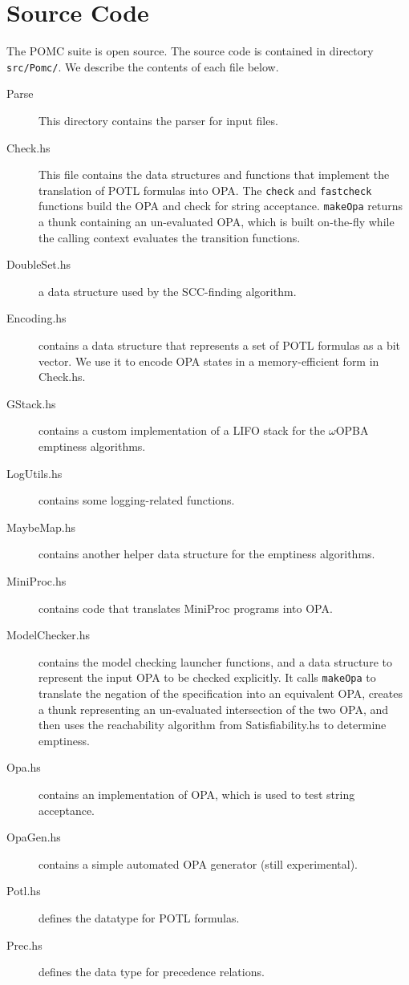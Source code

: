 \documentclass[9pt,a4paper]{article}
\begin{document}
\section{Source Code}
\label{sec:sources}
The POMC suite is open source.
The source code is contained in directory \texttt{src/Pomc/}.
We describe the contents of each file below.
\begin{description}
\item[Parse] This directory contains the parser for input files.
\item[Check.hs] This file contains the data structures and functions
  that implement the translation of POTL formulas into OPA.
  The \texttt{check} and \texttt{fastcheck} functions build the OPA
  and check for string acceptance. \texttt{makeOpa} returns
  a thunk containing an un-evaluated OPA, which is built on-the-fly
  while the calling context evaluates the transition functions.
\item[DoubleSet.hs] a data structure used by the SCC-finding algorithm.
\item[Encoding.hs] contains a data structure that represents a set of POTL
  formulas as a bit vector. We use it to encode OPA states in a
  memory-efficient form in Check.hs.
\item[GStack.hs] contains a custom implementation of a LIFO stack
  for the $\omega$OPBA emptiness algorithms.
\item[LogUtils.hs] contains some logging-related functions.
\item[MaybeMap.hs] contains another helper data structure for the emptiness algorithms.
\item[MiniProc.hs] contains code that translates MiniProc programs into OPA.
\item[ModelChecker.hs] contains the model checking launcher functions,
  and a data structure to represent the input OPA to be checked explicitly.
  It calls \texttt{makeOpa} to translate the negation of the specification
  into an equivalent OPA, creates a thunk representing an un-evaluated
  intersection of the two OPA, and then uses the reachability algorithm from
  Satisfiability.hs to determine emptiness.
\item[Opa.hs] contains an implementation of OPA, which is used to test
  string acceptance.
\item[OpaGen.hs] contains a simple automated OPA generator (still experimental).
\item[Potl.hs] defines the datatype for POTL formulas.
\item[Prec.hs] defines the data type for precedence relations.

\end{description}
\end{document}

